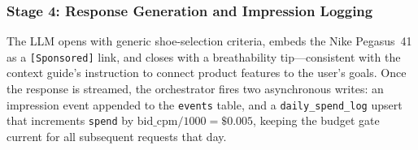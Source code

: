 \subsubsection{Stage 4: Response Generation and Impression Logging}
\label{subsubsec:example1-response}

The LLM opens with generic shoe-selection criteria, embeds the Nike
Pegasus~41 as a \texttt{[Sponsored]} link, and closes with a breathability
tip---consistent with the context guide's instruction to connect product
features to the user's goals.  Once the response is streamed, the orchestrator
fires two asynchronous writes: an impression event appended to the
\texttt{events} table, and a \texttt{daily\_spend\_log} upsert that increments
\texttt{spend} by $\text{bid\_cpm}/1000 = \$0.005$, keeping the budget gate
current for all subsequent requests that day.
